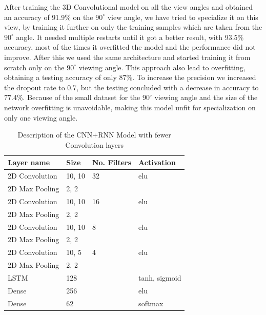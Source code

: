 \documentclass[12pt]{article}
\theoremstyle{definition}
\begin{document}
	After training the 3D Convolutional model on all the view angles and obtained an accuracy of 91.9\% on the $90^\circ$ view angle, we have tried to specialize it on this view, by training it further on only the training samples which are taken from the $90^\circ$ angle. It needed multiple restarts until it got a better result, with 93.5\% accuracy, most of the times it overfitted the model and the performance did not improve. After this we used the same architecture and started training it from scratch only on the $90^\circ$ viewing angle. This approach also lead to overfitting, obtaining a testing accuracy of only 87\%. To increase the precision we increased the dropout rate to 0.7, but the testing concluded with a decrease in accuracy to 77.4\%. Because of the small dataset for the $90^\circ$ viewing angle and the size of the network overfitting is unavoidable, making this model unfit for specialization on only one viewing angle.

	\begin{table}[ht]
		\centering
		\renewcommand{\arraystretch}{1.35}

		\caption{Description of the CNN+RNN Model with fewer Convolution layers}
		\label{table:small-CNN-LSTM}

		\begin{tabularx}{\textwidth}{XXXX}
			\textbf{Layer name} & \textbf{Size} & \textbf{No. Filters} & \textbf{Activation} \\ \hline
			2D Convolution & 10, 10 & 32                   & elu                  \\ \hline
			2D Max Pooling & 2, 2   & \textbf{\textendash} & \textbf{\textendash} \\ \hline
			2D Convolution & 10, 10 & 16                   & elu                  \\ \hline
			2D Max Pooling & 2, 2   & \textbf{\textendash} & \textbf{\textendash} \\ \hline
			2D Convolution & 10, 10 & 8                    & elu                  \\ \hline
			2D Max Pooling & 2, 2   & \textbf{\textendash} & \textbf{\textendash} \\ \hline
			2D Convolution & 10, 5  & 4                    & elu                  \\ \hline
			2D Max Pooling & 2, 2   & \textbf{\textendash} & \textbf{\textendash} \\ \hline
			LSTM           & 128    & \textbf{\textendash} & tanh, sigmoid        \\ \hline
			Dense          & 256    & \textbf{\textendash} & elu                  \\ \hline
			Dense          & 62     & \textbf{\textendash} & softmax              \\
		\end{tabularx}
	\end{table}
\end{document}
